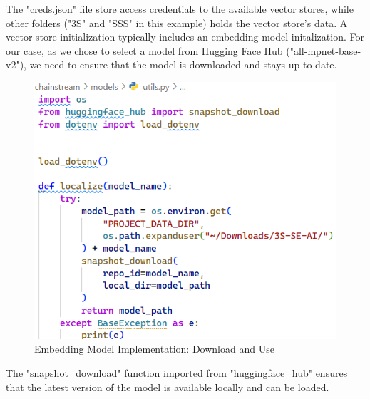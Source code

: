 The "creds.json" file store access credentials to the available vector stores, while other folders ("3S" and "SSS" in this example) holds the vector store's data.\newline
A vector store initialization typically includes an embedding model initalization. For our case, as we chose to select a model from Hugging Face Hub ("all-mpnet-base-v2"), we need to ensure that the model is downloaded and stays up-to-date.
\begin{figure}[htbp]
    \centering
    \includegraphics[width=\linewidth]{./figures/embedding-model-downloading.png}
    \caption{Embedding Model Implementation: Download and Use}
\end{figure}\newline
The "snapshot\_download" function imported from "huggingface\_hub" ensures that the latest version of the model is available locally and can be loaded.

